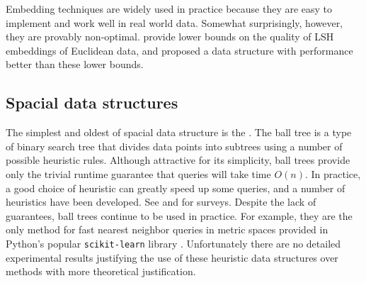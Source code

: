 \documentclass[thesis.tex]{subfiles}
\begin{document}
Embedding techniques are widely used in practice because they are easy to implement and work well in real world data.
Somewhat surprisingly, however, they are provably non-optimal.
\cite{o2014optimal} provide lower bounds on the quality of LSH embeddings of Euclidean data,
and \cite{andoni2014beyond} proposed a data structure with performance better than these lower bounds.


\subsection{Spacial data structures}

%
The simplest and oldest of spacial data structure is the  \citep{omohundro1989}.
The ball tree is a type of binary search tree that divides data points into subtrees using a number of possible heuristic rules.
Although attractive for its simplicity, 
ball trees provide only the trivial runtime guarantee that queries will take time $O(n)$.
In practice, a good choice of heuristic can greatly speed up some queries,
and a number of heuristics have been developed.
See \cite{zezula2006similarity} and \cite{mao2016pivot} for surveys.
Despite the lack of guarantees,
ball trees continue to be used in practice.
For example, they are the only method for fast nearest neighbor queries in metric spaces provided in Python's popular \texttt{scikit-learn} library \citep{scikit-learn}.
Unfortunately there are no detailed experimental results justifying the use of these heuristic data structures over methods with more theoretical justification.
\end{document}
